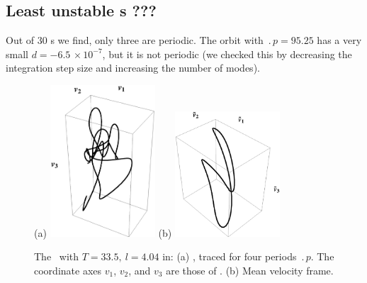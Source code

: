 %


\subsection*{Least unstable \rpo s ???}

%
Out of 30 \rpo s we
find,  only three are periodic.  The orbit
with $\period{p} = 95.25$ has a very small
$d = -6.5\,\times 10^{-7}$, but it is not periodic
(we
checked this by decreasing the integration step size and increasing the
number of modes).


\begin{figure}[t] \label{f:rpo55}
\begin{center}
(a) \includegraphics[width=0.35\textwidth]{figs/ks22rpo033.50_04.045E2.eps}
(b) \includegraphics[width=0.35\textwidth]{figs/ks22rpo033.50_04.045E2CM.eps}
\\
\end{center}
\caption{
 The \rpo\ with $T=33.5,\  l=4.04$ in:
 (a) \Statesp, traced for four periods $\period{p}$. The coordinate axes
$v_1$, $v_2$, and $v_3$ are those of .
 (b) Mean velocity frame.
        }
\end{figure}



